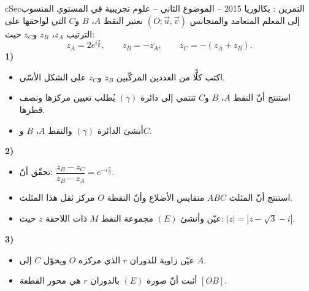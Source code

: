 \documentclass[12pt,a4paper]{article}
\newenvironment{BOX}[2]{\begin{otherlanguage}{english}\begin{arbox}{#1}{#2}}{\end{arbox}\end{otherlanguage}}
\newcounter{exo}
\newenvironment{tamrin}[1]{\stepcounter{exo}\begin{BOX}{cSec}{التمرين \theexo: #1}}{\end{BOX}}
\newenvironment{sq}{\begin{itemize}[leftmargin=2.4em,itemsep=3pt]}{\end{itemize}}
\newcommand{\qa}{\item[(أ)]}\newcommand{\qb}{\item[(ب)]}\newcommand{\qc}{\item[(جـ)]}\newcommand{\qd}{\item[(د)]}\newcommand{\qe}{\item[(هـ)]}
\begin{document}
\begin{tamrin}{بكالوريا 2015 -- الموضوع الثاني -- علوم تجريبية}
في المستوي المنسوب إلى المعلم المتعامد والمتجانس $(O;\vec u,\vec v)$ نعتبر النقط $A$، $B$ و$C$ التي لواحقها على الترتيب $z_A$، $z_B$ و$z_C$ حيث:
\[z_A=2e^{i\frac{\pi}{6}},\qquad z_B=-\overline{z_A},\qquad z_C=-(z_A+z_B).\]
\textbf{1)}
\begin{sq}
\qa اكتب كلًّا من العددين المركّبين $z_B$ و$z_C$ على الشكل الأسّي.
\qb استنتج أنّ النقط $A$، $B$ و$C$ تنتمي إلى دائرة $(\gamma)$ يُطلب تعيين مركزها ونصف قطرها.
\qc أنشئ الدائرة $(\gamma)$ والنقط $A$، $B$ و$C$.
\end{sq}
\textbf{2)}
\begin{sq}
\qa تحقّق أنّ: $\dfrac{z_B-z_C}{z_B-z_A}=e^{-i\frac{\pi}{3}}$.
\qb استنتج أنّ المثلث $ABC$ متقايس الأضلاع وأنّ النقطة $O$ مركز ثقل هذا المثلث.
\qc عيّن وأنشئ $(E)$ مجموعة النقط $M$ ذات اللاحقة $z$ حيث: $|z|=\left|z-\sqrt3-i\right|$.
\end{sq}
\textbf{3)}
\begin{sq}
\qa عيّن زاوية للدوران $r$ الذي مركزه $O$ ويحوّل $C$ إلى $A$.
\qb أثبت أنّ صورة $(E)$ بالدوران $r$ هي محور القطعة $[OB]$.
\end{sq}
\end{tamrin}
\end{document}
